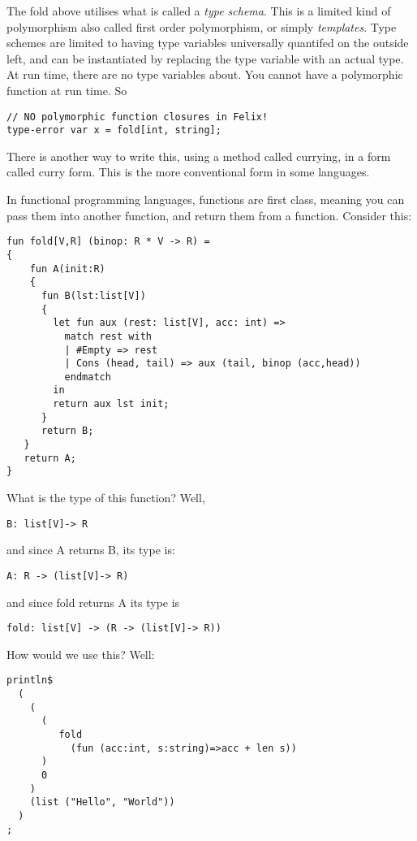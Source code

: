 \documentclass[oneside]{book}
\begin{document}
The fold above utilises what is called a {\em type schema}.
This is a limited kind of polymorphism also called
first order polymorphism, or simply {\em templates}.
Type schemes are limited to having type variables universally
quantifed on the outside left, and can be instantiated by replacing
the type variable with an actual type. At run time, there
are no type variables about. You cannot have a polymorphic
function at run time. So

\begin{verbatim}
// NO polymorphic function closures in Felix!
type-error var x = fold[int, string];
\end{verbatim}

There is another way to write this, using a method called
currying, in a form called curry form. This is the more
conventional form in some languages.

In functional programming languages, functions are first
class, meaning you can pass them into another function,
and return them from a function. Consider this:

\begin{verbatim}
fun fold[V,R] (binop: R * V -> R) =
{
    fun A(init:R) 
    {
      fun B(lst:list[V]) 
      {  
        let fun aux (rest: list[V], acc: int) =>
          match rest with
          | #Empty => rest
          | Cons (head, tail) => aux (tail, binop (acc,head))
          endmatch
        in 
        return aux lst init;
      }
      return B;
   }
   return A;
}
\end{verbatim}

What is the type of this function? Well, 

\begin{verbatim}
B: list[V]-> R
\end{verbatim}

and since A returns B, its type is:

\begin{verbatim}
A: R -> (list[V]-> R)
\end{verbatim}

and since fold returns A its type is

\begin{verbatim}
fold: list[V] -> (R -> (list[V]-> R))
\end{verbatim}

How would we use this? Well:

\begin{verbatim}
println$ 
  (
    (
      (
         fold 
           (fun (acc:int, s:string)=>acc + len s))
      )
      0
    )
    (list ("Hello", "World"))
  )
;
\end{verbatim}
\end{document}
